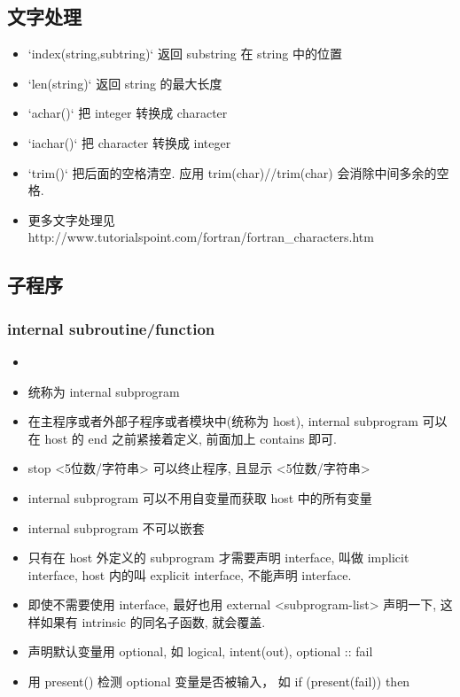 \subsection{文字处理}
\begin{itemize}
\item `index(string,subtring)` 返回 substring 在 string 中的位置
\item `len(string)` 返回 string 的最大长度
\item `achar()` 把 integer 转换成 character
\item `iachar()` 把 character 转换成 integer
\item `trim()` 把后面的空格清空. 应用  trim(char)//trim(char) 会消除中间多余的空格.
\item 更多文字处理见 http://www.tutorialspoint.com/fortran/fortran_characters.htm
\end{itemize}

\subsection{子程序}
\subsubsection{internal subroutine/function}
\begin{itemize}
\item \item 统称为 internal subprogram
\item 在主程序或者外部子程序或者模块中(统称为 host), internal subprogram 可以在 host 的 end 之前紧接着定义, 前面加上 contains 即可.
\item  stop <5位数/字符串> 可以终止程序, 且显示 <5位数/字符串>
\item internal subprogram 可以不用自变量而获取 host 中的所有变量
\item internal subprogram 不可以嵌套
\item 只有在 host 外定义的 subprogram 才需要声明 interface, 叫做 implicit interface, host 内的叫 explicit interface, 不能声明 interface.
\item 即使不需要使用 interface, 最好也用 external <subprogram-list> 声明一下, 这样如果有 intrinsic 的同名子函数, 就会覆盖.
\item 声明默认变量用 optional, 如 logical, intent(out), optional :: fail
\item 用 present() 检测 optional 变量是否被输入， 如 if (present(fail)) then
\end{itemize}

